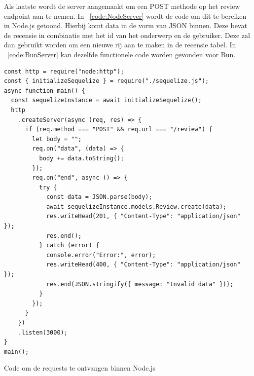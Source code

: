 Als laatste wordt de server aangemaakt om een POST methode op het review endpoint aan te nemen.
In ~\ref{code:NodeServer} wordt de code om dit te bereiken in Node.js getoond. Hierbij komt data in de vorm van JSON binnen.
Deze bevat de recensie in combinatie met het id van het onderwerp en de gebruiker.
Deze zal dan gebruikt worden om een nieuwe rij aan te maken in de recensie tabel.
In ~\ref{code:BunServer} kan dezelfde functionele code worden gevonden voor Bun.

\begin{listing}[H]
  \centering
  \begin{verbatim}
const http = require("node:http");
const { initializeSequelize } = require("./sequelize.js");
async function main() {
  const sequelizeInstance = await initializeSequelize();
  http
    .createServer(async (req, res) => {
      if (req.method === "POST" && req.url === "/review") {
        let body = "";
        req.on("data", (data) => {
          body += data.toString();
        });
        req.on("end", async () => {
          try {
            const data = JSON.parse(body);
            await sequelizeInstance.models.Review.create(data);
            res.writeHead(201, { "Content-Type": "application/json" });
            res.end();
          } catch (error) {
            console.error("Error:", error);
            res.writeHead(400, { "Content-Type": "application/json" });
            res.end(JSON.stringify({ message: "Invalid data" }));
          }
        });
      }
    })
    .listen(3000);
}
main();
\end{verbatim}
\caption{\label{code:NodeServer}Code om de requests te ontvangen binnen Node.js}
\end{listing}
